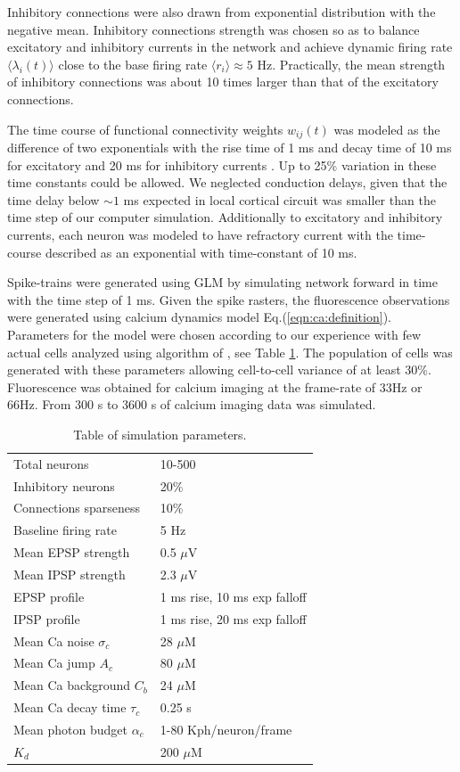 Inhibitory connections were also drawn from exponential distribution with the negative mean. Inhibitory connections strength was chosen so as to balance excitatory and inhibitory currents in the network and achieve dynamic firing rate $\langle \lambda_i(t) \rangle$ close to the base firing rate $\langle r_i\rangle \approx 5 $ Hz. Practically, the mean strength of inhibitory connections was about 10 times larger than that of the excitatory connections. 

The time course of functional connectivity weights $w_{ij}(t)$ was modeled as the difference of two exponentials with the rise time of 1 ms and decay time of 10 ms for excitatory and 20 ms for inhibitory currents \cite{Sayer1990}. Up to 25\% variation in these time constants could be allowed. We neglected conduction delays, given that the time delay below $\sim 1$ ms expected in local cortical circuit was smaller than the time step of our computer simulation.  Additionally to excitatory and inhibitory currents, each neuron was modeled to have refractory current with the time-course described as an exponential with time-constant of 10 ms.

Spike-trains were generated using GLM by simulating network forward in time with the time step of 1 ms.  Given the spike rasters, the fluorescence observations were generated using calcium dynamics model Eq.(\ref{eqn:ca:definition}). Parameters for the model were chosen according to our experience with few actual cells analyzed using algorithm of \cite{Vogelstein2009}, see Table \ref{table:caparm}.  The population of cells was generated with these parameters allowing cell-to-cell variance of at least 30\%.  Fluorescence was obtained for calcium imaging at the frame-rate of 33Hz or 66Hz.  From 300 s to 3600 s of calcium imaging data was simulated.

\begin{table}[h!b!p!]
\caption{Table of simulation parameters.}\label{table:caparm}
\begin{tabular}{ll}
\hline
Total neurons & 10-500 \\
Inhibitory neurons & 20\% \\
Connections sparseness & 10\% \\
Baseline firing rate & 5 Hz \\
Mean EPSP strength & 0.5 $\mu$V \\
Mean IPSP strength & 2.3 $\mu$V\\
EPSP profile & 1 ms rise, 10 ms exp falloff \\
IPSP profile & 1 ms rise, 20 ms exp falloff \\
\hline
Mean Ca noise $\sigma_c$ & 28 $\mu$M \\
Mean Ca jump $A_c$ & 80 $\mu$M \\
Mean Ca background $C_b$ & 24 $\mu$M \\
Mean Ca decay time $\tau_c$ & 0.25 s \\
Mean photon budget $\alpha_c$ & 1-80 Kph/neuron/frame \\
$K_d$ & 200 $\mu$M \\
\hline
\end{tabular}
\end{table}

